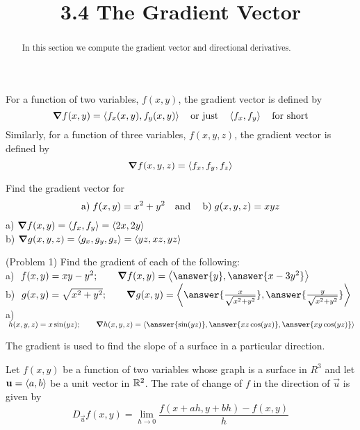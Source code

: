 \documentclass[handout]{ximera}
\title{3.4 The Gradient Vector}
\begin{document}
\begin{abstract}
In this section we compute the gradient vector and directional derivatives.
\end{abstract}

\maketitle

\begin{definition}
For a function of two variables, $f(x,y)$, the gradient vector is defined by
\[
\boldsymbol\nabla f(x,y) = \left\langle f_x(x,y), f_y(x,y)\right\rangle \quad \text{or just} \quad \left\langle f_x, f_y\right\rangle \quad \text{for short}
\]
Similarly, for a function of three variables, $f(x,y, z)$, the gradient vector is defined by
\[
\boldsymbol\nabla f(x,y, z) = \left\langle f_x, f_y, f_z\right\rangle
\]
\end{definition}

\begin{example}[Example 1]
Find the gradient vector for 
\[
\text{a)} \;f(x,y) = x^2 + y^2\quad \text{and \;\;  b)} \;g(x, y, z) = xyz
\]
a) $\boldsymbol\nabla f(x,y) = \left\langle f_x, f_y\right\rangle = \left\langle 2x, 2y\right\rangle$ \\
b) $\boldsymbol\nabla g(x,y, z) = \left\langle g_x, g_y, g_z\right\rangle= \left\langle yz, xz, yz\right\rangle$
\end{example}

\begin{problem}(Problem 1)
Find the gradient of each of the following:\\
a) $\;f(x,y) = xy - y^2; \quad \quad \grad f(x,y) = \vector{\answer{y}, \answer{x - 3y^2}}$\\
b) $\;g(x,y) = \sqrt{x^2 + y^2}; \quad \quad  \grad g(x,y) = \vector{\answer{\frac{x}{\sqrt{x^2 + y^2}}}, \answer{\frac{y}{\sqrt{x^2 + y^2}}}}$\\
a) $\;h(x,y, z) = x\sin(yz); \quad \quad \grad h(x,y, z) = \vector{\answer{\sin(yz)}, \answer{xz\cos(yz)} , \answer{xy\cos(yz)} }$\\
\end{problem}

The gradient is used to find the slope of a surface in a particular direction.

\begin{definition}
Let $f(x,y)$ be a function of two variables whose graph is a surface in $R^3$ and let $\mathbf u = \left\langle a,b\right\rangle$ be a unit vector in $\mathbb R^2$.
The rate of change of $f$ in the direction of $\vec u$ is given by
\[
D_{\vec u} f(x,y) = \lim_{h \to 0} \frac{f(x + ah, y + bh) -f(x,y)}{h}
\]
\end{definition}
\end{document}
